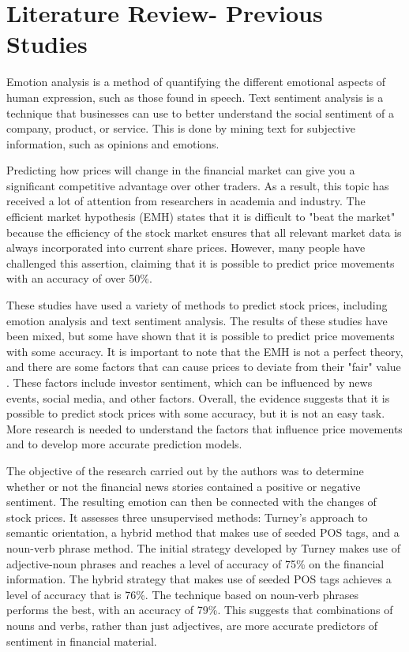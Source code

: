 \documentclass[12pt, a4paper,twoside]{report}
\theoremstyle{plain} %
\theoremstyle{definition} %
\theoremstyle{remark} %
\numberwithin{equation}{chapter}
\begin{document}
\chapter{Literature Review- Previous Studies}\label{ch:2}

Emotion analysis is a method of quantifying the different emotional aspects of human expression, such as those found in speech. Text sentiment analysis is a technique that businesses can use to better understand the social sentiment of a company, product, or service. This is done by mining text for subjective information, such as opinions and emotions.

Predicting how prices will change in the financial market can give you a significant competitive advantage over other traders. As a result, this topic has received a lot of attention from researchers in academia and industry. The efficient market hypothesis (EMH) states that it is difficult to "beat the market" because the efficiency of the stock market ensures that all relevant market data is always incorporated into current share prices. However, many people have challenged this assertion, claiming that it is possible to predict price movements with an accuracy of over 50\%.

These studies have used a variety of methods to predict stock prices, including emotion analysis and text sentiment analysis. The results of these studies have been mixed, but some have shown that it is possible to predict price movements with some accuracy. It is important to note that the EMH is not a perfect theory, and there are some factors that can cause prices to deviate from their "fair" value \cite{qian2007stock}. These factors include investor sentiment, which can be influenced by news events, social media, and other factors. Overall, the evidence suggests that it is possible to predict stock prices with some accuracy, but it is not an easy task. More research is needed to understand the factors that influence price movements and to develop more accurate prediction models.

The objective of the research carried out by the authors was to determine whether or not the financial news stories contained a positive or negative sentiment. The resulting emotion can then be connected with the changes of stock prices. It assesses three unsupervised methods: Turney's approach to semantic orientation, a hybrid method that makes use of seeded POS tags, and a noun-verb phrase method. The initial strategy developed by Turney makes use of adjective-noun phrases and reaches a level of accuracy of 75\% on the financial information. The hybrid strategy that makes use of seeded POS tags achieves a level of accuracy that is 76\%. The technique based on noun-verb phrases performs the best, with an accuracy of 79\%. This suggests that combinations of nouns and verbs, rather than just adjectives, are more accurate predictors of sentiment in financial material. \cite{Khan2013}
\end{document}

